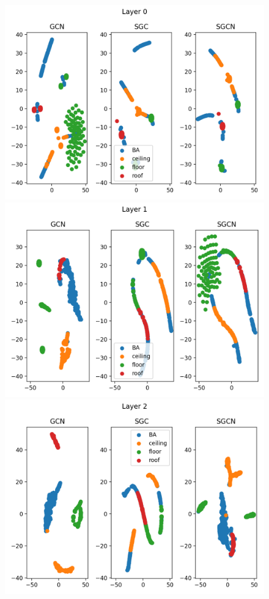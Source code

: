 \begin{figure}
    \centering
    \includegraphics[width=0.40\textheight]{figures/SGCN-latent-space-0}
    \includegraphics[width=0.40\textheight]{figures/SGCN-latent-space-1}
    \includegraphics[width=0.40\textheight]{figures/SGCN-latent-space-2}

\end{figure}
